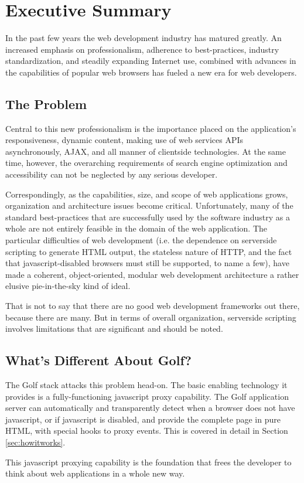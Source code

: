 \section{Executive Summary}

In the past few years the web development industry has matured
greatly.  An increased emphasis on professionalism, adherence to
best-practices, industry standardization, and steadily expanding
Internet use, combined with advances in the capabilities of popular
web browsers has fueled a new era for web developers.

\subsection{The Problem}

Central to this new professionalism is the importance placed on the
application's responsiveness, dynamic content, making use of web
services APIs asynchronously, AJAX, and all manner of clientside
technologies. At the same time, however, the overarching requirements
of search engine optimization and accessibility can not be neglected
by any serious developer.

Correspondingly, as the capabilities, size, and scope of web
applications grows, organization and architecture issues become
critical. Unfortunately, many of the standard best-practices that are
successfully used by the software industry as a whole are not entirely
feasible in the domain of the web application. The particular
difficulties of web development (i.e. the dependence on serverside
scripting to generate HTML output, the stateless nature of HTTP, and
the fact that javascript-disabled browsers must still be supported, to
name a few), have made a coherent, object-oriented, modular web
development architecture a rather elusive pie-in-the-sky kind of
ideal.

That is not to say that there are no good web development frameworks
out there, because there are many. But in terms of overall
organization, serverside scripting involves limitations that are
significant and should be noted.

\subsection{What's Different About Golf?}

The Golf stack attacks this problem head-on. The basic enabling
technology it provides is a fully-functioning javascript proxy
capability. The Golf application server can automatically and 
transparently detect when a browser does not have javascript, or
if javascript is disabled, and provide the complete page in pure
HTML, with special hooks to proxy events. This is covered in
detail in Section \ref{sec:howitworks}.

This javascript proxying capability is the foundation that frees
the developer to think about web applications in a whole new way.
